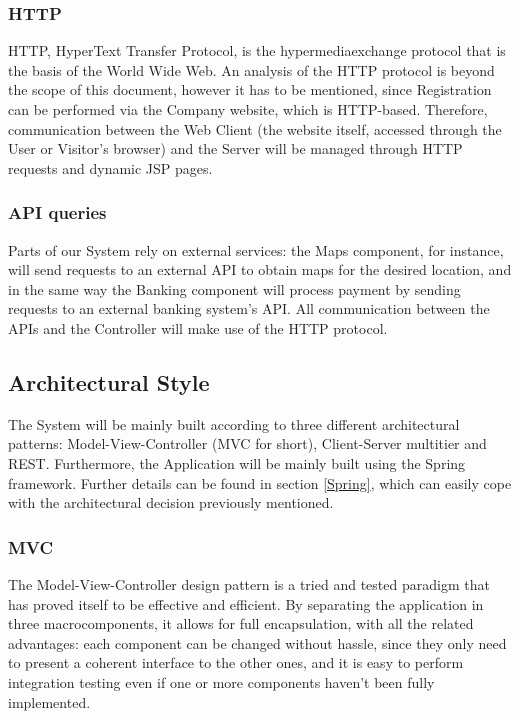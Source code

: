 \documentclass[12pt]{article}
\begin{document}
\subsubsection{HTTP}
HTTP, HyperText Transfer Protocol, is the hypermediaexchange protocol that is the basis of the World Wide Web. An analysis of the HTTP protocol is beyond the scope of this document, however it has to be mentioned, since Registration can be performed via the Company website, which is HTTP-based. Therefore, communication between the Web Client (the website itself, accessed through the User or Visitor's browser) and the Server will be managed through HTTP requests and dynamic JSP pages.

\subsubsection{API queries}
Parts of our System rely on external services: the Maps component, for instance, will send requests to an external API to obtain maps for the desired location, and in the same way the Banking component will process payment by sending requests to an external banking system's API. All communication between the APIs and the Controller will make use of the HTTP protocol.

\subsection{Architectural Style}
The System will be mainly built according to three different architectural patterns: Model-View-Controller (MVC for short), Client-Server multitier and REST. 
Furthermore, the Application will be mainly built using the Spring framework. Further details can be found in section \ref{Spring}, which can easily cope with the architectural decision previously mentioned.

\subsubsection{MVC}\label{MVC}
The Model-View-Controller design pattern is a tried and tested paradigm that has proved itself to be effective and efficient. By separating the application in three macrocomponents, it allows for full encapsulation, with all the related advantages: each component can be changed without hassle, since they only need to present a coherent interface to the other ones, and it is easy to perform integration testing even if one or more components haven't been fully implemented.
\end{document}
